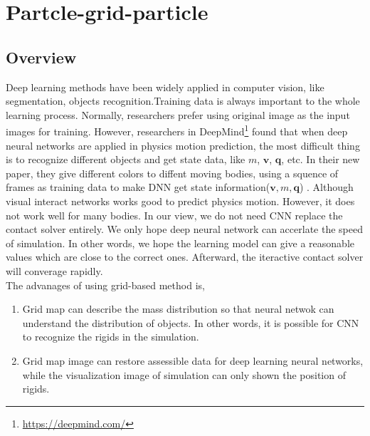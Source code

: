 \chapter{Partcle-grid-particle}
\section{Overview}
    Deep learning methods have been widely applied in computer vision, like segmentation, objects recognition.Training data is always important to the whole learning process. Normally, researchers prefer using original image as the input images for training. However, researchers in DeepMind\footnote{\url{https://deepmind.com/}} found that when deep neural networks are applied in physics motion prediction, the most difficult thing is to recognize different objects and get state data, like $m$, $\pmb{v}$, $\pmb{q}$, etc. In their new paper, they give different colors to diffent moving bodies, using a squence of frames as training data to make DNN get state information($\pmb{v}, m, \pmb{q}$) \cite{DBLP:journals/corr/WattersTWPBZ17}.  Although visual interact networks works good to predict physics motion. However, it does not work well for many bodies. In our view, we do not need CNN replace the contact solver entirely. We only hope deep neural network can accerlate the speed of simulation. In other words, we hope the learning model can give a reasonable values which are close to the correct ones. Afterward, the iteractive contact solver will converage rapidly.\\
    The advanages of using grid-based method is,
    \begin{enumerate}
        \item Grid map can describe the mass distribution so that neural netwok can understand the distribution of objects. In other words, it is possible for CNN to recognize the rigids in the simulation.
        \item Grid map image can restore assessible data for deep learning neural networks, while the visualization image of simulation can only shown the position of rigids.
    \end{enumerate}

